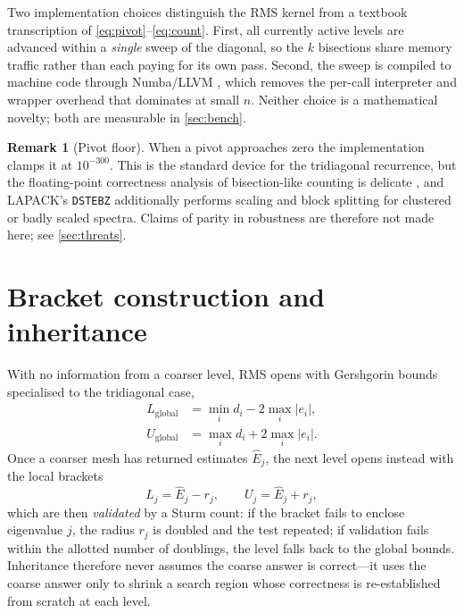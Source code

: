 \documentclass[twocolumn,10pt,a4paper]{article}
\theoremstyle{plain}
\theoremstyle{definition}
\newtheorem{remark}{Remark}
\begin{document}
Two implementation choices distinguish the RMS kernel from a textbook
transcription of \eqref{eq:pivot}--\eqref{eq:count}. First, all currently active
levels are advanced within a \emph{single} sweep of the diagonal, so the $k$
bisections share memory traffic rather than each paying for its own pass.
Second, the sweep is compiled to machine code through Numba/LLVM
\citep{lam2015}, which removes the per-call interpreter and wrapper overhead
that dominates at small $n$. Neither choice is a mathematical novelty; both are
measurable in \cref{sec:bench}.

\begin{remark}[Pivot floor]
When a pivot approaches zero the implementation clamps it at $10^{-300}$. This
is the standard device for the tridiagonal recurrence, but the floating-point
correctness analysis of bisection-like counting is delicate
\citep{demmel1995}, and LAPACK's \texttt{DSTEBZ} additionally performs scaling
and block splitting for clustered or badly scaled spectra. Claims of parity in
robustness are therefore not made here; see \cref{sec:threats}.
\end{remark}

\section{Bracket construction and inheritance}
\label{sec:brackets}

With no information from a coarser level, RMS opens with Gershgorin bounds
specialised to the tridiagonal case,
\begin{equation}
\begin{aligned}
L_{\mathrm{global}} &= \min_{i} d_{i} - 2\max_{i}|e_{i}|,\\
U_{\mathrm{global}} &= \max_{i} d_{i} + 2\max_{i}|e_{i}| .
\end{aligned}
\end{equation}
Once a coarser mesh has returned estimates $\widehat{E}_{j}$, the next level
opens instead with the local brackets
\begin{equation}
L_{j} = \widehat{E}_{j} - r_{j},
\qquad
U_{j} = \widehat{E}_{j} + r_{j},
\end{equation}
which are then \emph{validated} by a Sturm count: if the bracket fails to
enclose eigenvalue $j$, the radius $r_{j}$ is doubled and the test repeated; if
validation fails within the allotted number of doublings, the level falls back
to the global bounds. Inheritance therefore never assumes the coarse answer is
correct---it uses the coarse answer only to shrink a search region whose
correctness is re-established from scratch at each level.
\end{document}
